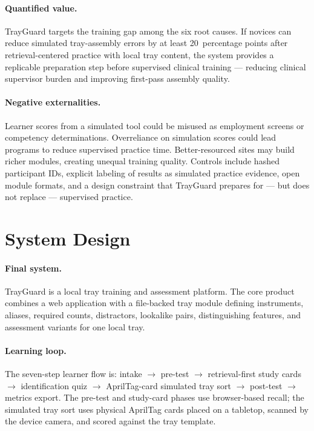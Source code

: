\documentclass[10pt]{article}
\begin{document}
\paragraph{Quantified value.}
TrayGuard targets the training gap among the six root causes. If novices can
reduce simulated tray-assembly errors by at least 20~percentage points after
retrieval-centered practice with local tray content, the system provides a
replicable preparation step before supervised clinical training --- reducing
clinical supervisor burden and improving first-pass assembly quality.

\paragraph{Negative externalities.}
Learner scores from a simulated tool could be misused as employment screens or
competency determinations. Overreliance on simulation scores could lead
programs to reduce supervised practice time. Better-resourced sites may build
richer modules, creating unequal training quality. Controls include hashed
participant IDs, explicit labeling of results as simulated practice evidence,
open module formats, and a design constraint that TrayGuard prepares for ---
but does not replace --- supervised practice.

\section*{System Design}

\paragraph{Final system.}
TrayGuard is a local tray training and assessment platform. The core product
combines a web application with a file-backed tray module defining instruments,
aliases, required counts, distractors, lookalike pairs, distinguishing
features, and assessment variants for one local tray.

\paragraph{Learning loop.}
The seven-step learner flow is: intake $\rightarrow$ pre-test $\rightarrow$
retrieval-first study cards $\rightarrow$ identification quiz $\rightarrow$
AprilTag-card simulated tray sort $\rightarrow$ post-test $\rightarrow$ metrics
export. The pre-test and study-card phases use browser-based recall; the
simulated tray sort uses physical AprilTag cards placed on a tabletop, scanned
by the device camera, and scored against the tray template.
\end{document}
